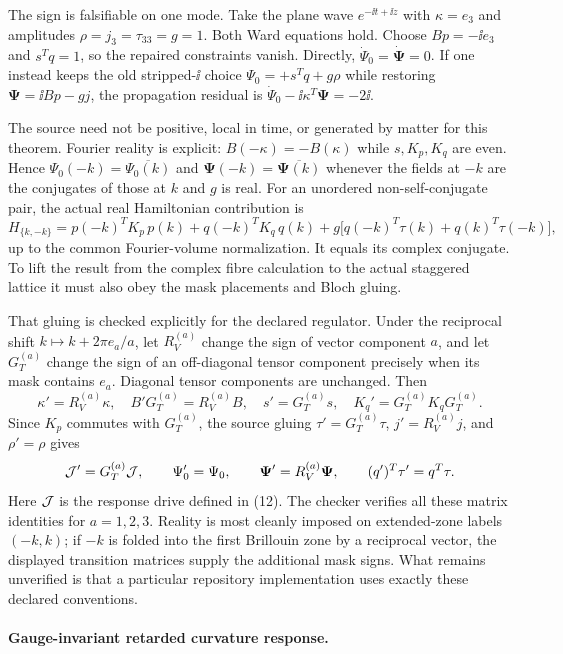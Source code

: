 The sign is falsifiable on one mode.  Take the plane wave
$e^{-\ii t+\ii z}$ with $\kappa=e_3$ and amplitudes
$\rho=j_3=\tau_{33}=g=1$.  Both Ward equations hold.  Choose
$Bp=-\ii e_3$ and $s^Tq=1$, so the repaired constraints vanish.  Directly,
$\dot\Psi_0=\dot{\boldsymbol\Psi}=0$.  If one instead keeps the old stripped-$\ii$
choice $\Psi_0=+s^Tq+g\rho$ while restoring
$\boldsymbol\Psi=\ii Bp-gj$, the propagation residual is
$\dot\Psi_0-\ii\kappa^T\boldsymbol\Psi=-2\ii$.

The source need not be positive, local in time, or generated by matter for
this theorem.  Fourier reality is explicit:
$B(-\kappa)=-B(\kappa)$ while $s,K_p,K_q$ are even.  Hence
$\Psi_0(-k)=\overline{\Psi_0(k)}$ and
$\boldsymbol\Psi(-k)=\overline{\boldsymbol\Psi(k)}$ whenever the fields at $-k$ are the
conjugates of those at $k$ and $g$ is real.  For an unordered non-self-conjugate
pair, the actual real Hamiltonian contribution is
\[
 H_{\{k,-k\}}=p(-k)^TK_p\,p(k)+q(-k)^TK_q\,q(k)
 +g\bigl[q(-k)^T\tau(k)+q(k)^T\tau(-k)\bigr],
\]
up to the common Fourier-volume normalization.  It equals its complex
conjugate.  To lift the result from the
complex fibre calculation to the actual staggered lattice it must also obey
the mask placements and Bloch gluing.

That gluing is checked explicitly for the declared regulator.  Under the
reciprocal shift $k\mapsto k+2\pi e_a/a$, let $R_V^{(a)}$ change the sign of
vector component $a$, and let $G_T^{(a)}$ change the sign of an off-diagonal
tensor component precisely when its mask contains $e_a$.  Diagonal tensor
components are unchanged.  Then
\[
 \kappa'=R_V^{(a)}\kappa,\quad
 B'G_T^{(a)}=R_V^{(a)}B,\quad s'=G_T^{(a)}s,
 \quad K_q'=G_T^{(a)}K_qG_T^{(a)}.
\]
Since $K_p$ commutes with $G_T^{(a)}$, the source gluing
$\tau'=G_T^{(a)}\tau$, $j'=R_V^{(a)}j$, and $\rho'=\rho$ gives
\[
 \mathcal J'=G_T^{(a)}\mathcal J,\qquad
 \Psi_0'=\Psi_0,\qquad \boldsymbol\Psi'=R_V^{(a)}\boldsymbol\Psi,
 \qquad (q')^T\tau'=q^T\tau .
\]
Here $\mathcal J$ is the response drive defined in (12).  The checker verifies all
these matrix identities for $a=1,2,3$.  Reality is
most cleanly imposed on extended-zone labels $(-k,k)$; if $-k$ is folded into
the first Brillouin zone by a reciprocal vector, the displayed transition
matrices supply the additional mask signs.  What remains unverified is that a
particular repository implementation uses exactly these declared conventions.

\paragraph{Gauge-invariant retarded curvature response.}

